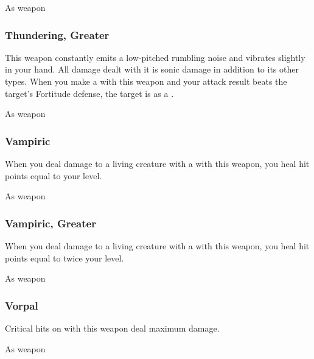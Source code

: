  


 As weapon


\lowercase{\hypertarget{item:Thundering, Greater}{}}\label{item:Thundering, Greater}
\hypertarget{item:Thundering, Greater}{\subsubsection{Thundering, Greater\hfill{}}}

This weapon constantly emits a low-pitched rumbling noise and vibrates slightly in your hand.
All damage dealt with it is sonic damage in addition to its other types.
When you make a  with this weapon and your attack result beats the target's Fortitude defense, the target is \deafened as a .



 


 As weapon


\lowercase{\hypertarget{item:Vampiric}{}}\label{item:Vampiric}
\hypertarget{item:Vampiric}{\subsubsection{Vampiric\hfill{}}}

When you deal damage to a living creature with a  with this weapon, you heal hit points equal to your level.



 


 As weapon


\lowercase{\hypertarget{item:Vampiric, Greater}{}}\label{item:Vampiric, Greater}
\hypertarget{item:Vampiric, Greater}{\subsubsection{Vampiric, Greater\hfill{}}}

When you deal damage to a living creature with a  with this weapon, you heal hit points equal to twice your level.



 


 As weapon


\lowercase{\hypertarget{item:Vorpal}{}}\label{item:Vorpal}
\hypertarget{item:Vorpal}{\subsubsection{Vorpal\hfill{}}}

Critical hits on  with this weapon deal maximum damage.



 


 As weapon
